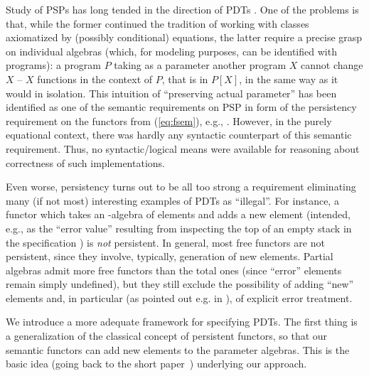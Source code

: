 Study of PSPs has long tended in the direction of PDTs \cite{paramADJ,Alge,paramGanz,CATs}. 
One of the problems
is that, while the former continued the tradition of working with classes
axiomatized by (possibly conditional) equations, the latter require a precise
grasp on individual algebras (which, for modeling purposes, can be
identified with programs): a program $P$ taking as a parameter another program
$X$ cannot change $X$ -- $X$ functions in the context of $P$, that is in $P[X]$, in the
same way as it would in isolation. This intuition of ``preserving actual
parameter'' has been identified as one of the semantic requirements on PSP in
form of the persistency requirement on the functors from (\ref{eq:fsem}),
e.g., \cite{paramGanz,paramPers,Alge}.
However, in the purely equational context, there was hardly any syntactic
counterpart of this semantic requirement. Thus, no syntactic/logical means
were available for reasoning about correctness of such implementations.

Even worse, persistency turns out to be all too strong a requirement
eliminating many (if not most) interesting examples of PDTs as
``illegal''. For instance, a functor which takes an -algebra of elements and
adds a new element (intended, e.g., as the ``error value'' resulting from inspecting the top of an empty
stack in the specification ) is {\em not} persistent. In
general, most free functors are not persistent, since they involve,
typically, generation of new elements. Partial algebras admit more free
functors than the total ones (since ``error'' elements remain simply
undefined), but they still exclude the possibility of adding ``new'' elements
and, in particular (as pointed out e.g. in \cite{partial}), of explicit error treatment.

We introduce a more adequate framework for specifying PDTs. The first
thing is a generalization of the classical concept of persistent functors, so
that our semantic functors can add new elements to the parameter algebras. 
This is the basic idea (going back to the short paper~\cite{paramPoigne})
underlying our approach.

